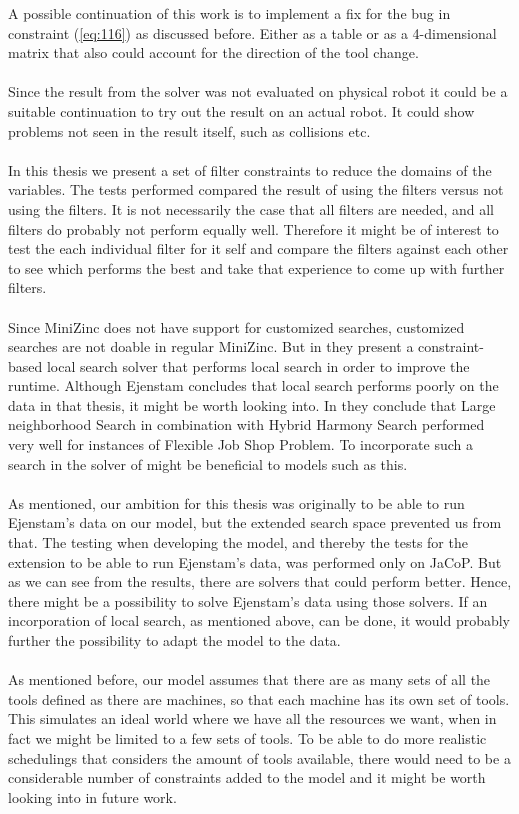 A possible continuation of this work is to implement a fix for the bug in constraint (\ref{eq:116}) as discussed before. Either as a table or as a 4-dimensional matrix that also could account for the direction of the tool change.
\\\\
Since the result from the solver was not evaluated on physical robot it could be a suitable continuation to try out the result on an actual robot. It could show problems not seen in the result itself, such as collisions etc.
\\\\
In this thesis we present a set of filter constraints to reduce the domains of the variables. The tests performed compared the result of using the filters versus not using the filters. It is not necessarily the case that all filters are needed, and all filters do probably not perform equally well. Therefore it might be of interest to test the each individual filter for it self and compare the filters against each other to see which performs the best and take that experience to come up with further filters.
\\\\
Since MiniZinc does not have support for customized searches, customized searches are not doable in regular MiniZinc. But in \cite{Bjordal} they present a constraint-based local search solver that performs local search in order to improve the runtime. Although Ejenstam concludes that local search performs poorly on the data in that thesis, it might be worth looking into. In \cite{yuan_2013} they conclude that Large neighborhood Search in combination with Hybrid Harmony Search performed very well for instances of Flexible Job Shop Problem. To incorporate such a search in the solver of \cite{Bjordal} might be beneficial to models such as this.
\\\\
As mentioned, our ambition for this thesis was originally to be able to run Ejenstam's data on our model, but the extended search space prevented us from that. The testing when developing the model, and thereby the tests for the extension to be able to run Ejenstam's data, was performed only on JaCoP. But as we can see from the results, there are solvers that could perform better. Hence, there might be a possibility to solve Ejenstam's data using those solvers. If an incorporation of local search, as mentioned above, can be done, it would probably further the possibility to adapt the model to the data.
\\\\
As mentioned before, our model assumes that there are as many sets of all the tools defined as there are machines, so that each machine has its own set of tools. This simulates an ideal world where we have all the resources we want, when in fact we might be limited to a few sets of tools. To be able to do more realistic schedulings that considers the amount of tools available, there would need to be a considerable number of constraints added to the model and it might be worth looking into in future work.